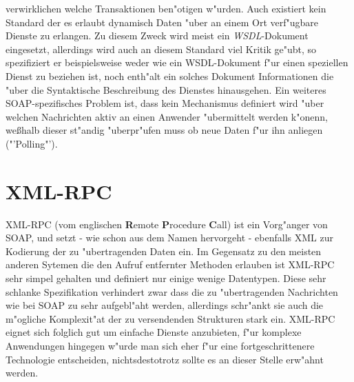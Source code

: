 verwirklichen welche Transaktionen ben"otigen w"urden. Auch existiert kein Standard der es erlaubt dynamisch Daten "uber an einem Ort verf"ugbare
Dienste zu erlangen. Zu diesem Zweck wird meist ein \emph{WSDL}-Dokument \cite{WSDLSPEC} eingesetzt, allerdings wird auch an diesem
Standard viel Kritik ge"ubt, so spezifiziert er beispielsweise weder wie ein WSDL-Dokument f"ur einen speziellen Dienst zu beziehen ist,
noch enth"alt ein solches Dokument Informationen die "uber die Syntaktische Beschreibung des Dienstes hinausgehen.
Ein weiteres SOAP-spezifisches Problem ist,
dass kein Mechanismus definiert wird "uber welchen Nachrichten aktiv an einen Anwender "ubermittelt werden k"onenn, we\ss halb dieser
st"andig "uberpr"ufen muss ob neue Daten f"ur ihn anliegen ("'Polling"').

\section{XML-RPC}
\label{sec:background:xmlrpc}
XML-RPC (vom englischen \textbf{R}emote \textbf{P}rocedure \textbf{C}all) ist ein Vorg"anger von SOAP, und setzt - wie schon
aus dem Namen hervorgeht - ebenfalls XML zur Kodierung der zu "ubertragenden Daten ein. Im Gegensatz zu den meisten anderen
Sytemen die den Aufruf entfernter Methoden erlauben ist XML-RPC sehr simpel gehalten und definiert nur einige wenige
Datentypen. Diese sehr schlanke Spezifikation verhindert zwar dass die zu "ubertragenden Nachrichten wie bei SOAP zu sehr 
aufgebl"aht werden, allerdings schr"ankt sie auch die m"ogliche Komplexit"at der zu versendenden Strukturen stark ein.
XML-RPC eignet sich folglich gut um einfache Dienste anzubieten, f"ur komplexe Anwendungen hingegen w"urde man sich eher 
f"ur eine fortgeschrittenere Technologie entscheiden, nichtsdestotrotz sollte es an dieser Stelle erw"ahnt werden.


